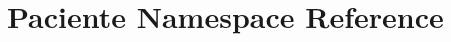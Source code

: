 \hypertarget{namespace_paciente}{}\section{Paciente Namespace Reference}
\label{namespace_paciente}
